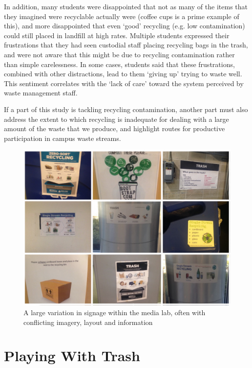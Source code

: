 \documentclass[nofonts,nols,justified,nobib]{tufte-book}
\begin{document}
In addition, many students were disappointed that not as many of the items that they imagined were recyclable actually were (coffee cups is a prime example of this), and more disappointed that even `good' recycling (e.g. low contamination) could still placed in landfill at high rates. Multiple students expressed their frustrations that they had seen custodial staff placing recycling bags in the trash, and were not aware that this might be due to recycling contamination rather than simple carelessness. In some cases, students said that these frustrations, combined with other distractions, lead to them `giving up' trying to waste well. This sentiment correlates with the `lack of care' toward the system perceived by waste management staff.

If a part of this study is tackling recycling contamination, another part must also address the extent to which recycling is inadequate for dealing with a large amount of the waste that we produce, and highlight routes for productive participation in campus waste streams.

\begin{figure}
\includegraphics[width=\textwidth]{img/2/signs-collage.jpg}
\caption{A large variation in signage within the media lab, often with conflicting imagery, layout and information}
\end{figure}


\chapter{Playing With Trash}
\end{document}
